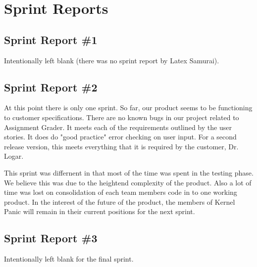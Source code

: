 
\chapter{Sprint Reports}

\section{Sprint Report \#1}
Intentionally left blank (there was no sprint report by Latex Samurai).


\section{Sprint Report \#2}

At this point there is only one sprint. So far, our product seems to be functioning to customer specifications. There are no known bugs
in our project related to Assignment Grader.
It meets
each of the requirements outlined by the user stories. It does do "good practice" error checking on user input.
For a second release version, this meets everything that it is required by the customer, Dr. Logar. 
\par{} This sprint
was differnent in that most of the time was spent in the testing phase. We believe this was due to the heightend complexity of the product. Also a lot of time was lost on consolidation of each team members code in to one working product.
In the interest of the future of the product, the members of Kernel Panic will remain in their current
positions for the next sprint.

\section{Sprint Report \#3}
Intentionally left blank for the final sprint.
